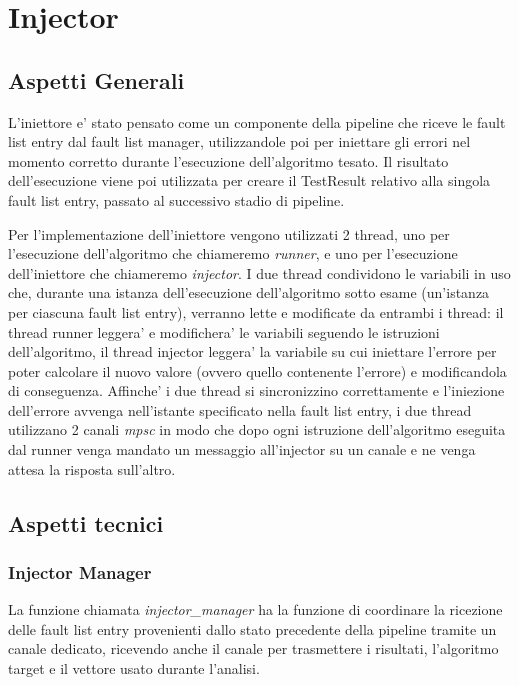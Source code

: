 \newpage
\section{Injector}\label{sec: Injector}
\subsection{Aspetti Generali}
L'iniettore e' stato pensato come un componente della pipeline che riceve le fault list entry dal fault list manager, utilizzandole poi per iniettare gli errori nel momento corretto durante l'esecuzione dell'algoritmo tesato. Il risultato dell'esecuzione viene poi utilizzata per creare il TestResult relativo alla singola fault list entry, passato al successivo stadio di pipeline. 

Per l'implementazione dell'iniettore vengono utilizzati 2 thread, uno per l'esecuzione dell'algoritmo che chiameremo \textit{runner}, e uno per l'esecuzione dell'i\-niettore che chiameremo \textit{injector}. I due thread condividono le variabili in uso che, durante una istanza dell'esecuzione dell'algoritmo sotto esame (un'istanza per ciascuna fault list entry), verranno lette e modificate da entrambi i thread: il thread runner leggera' e modifichera' le variabili seguendo le istruzioni dell'algo\-ritmo, il thread injector leggera' la variabile su cui iniettare l'errore per poter calcolare il nuovo valore (ovvero quello contenente l'errore) e modificandola di conseguenza. Affinche' i due thread si sincronizzino correttamente e l'iniezione dell'errore avvenga nell'istante specificato nella fault list entry, i due thread utilizzano 2 canali \textit{mpsc} in modo che dopo ogni istruzione dell'algoritmo eseguita dal runner venga mandato un messaggio all'injector su un canale e ne venga attesa la risposta sull'altro.

\subsection{Aspetti tecnici}
\subsubsection{Injector Manager}
La funzione chiamata \textit{injector\_manager} ha la funzione di coordinare la ricezione delle fault list entry provenienti dallo stato precedente della pipeline tramite un canale dedicato, ricevendo anche il canale per trasmettere i risultati, l'algoritmo target e il vettore usato durante l'analisi.

